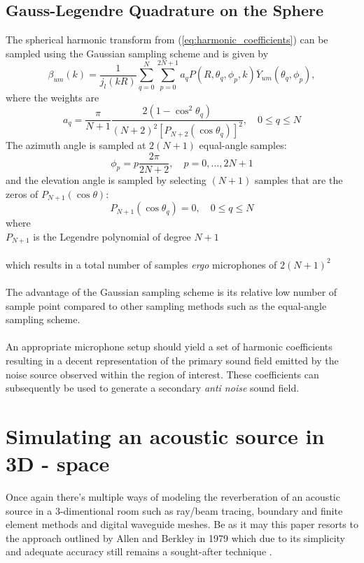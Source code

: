 \subsection{Gauss-Legendre Quadrature on the Sphere}\label{sec:Gauss}
The spherical harmonic transform from (\ref{eq:harmonic_coefficients}) can be sampled using the Gaussian sampling scheme and is given by
\begin{equation}
    \beta_{um}(k) = \frac{1}{j_l(kR)} \sum_{q=0}^N\sum_{p=0}^{2N+1}a_qP(R,\theta_q,\phi_p,k)\overline Y_{um}(\theta_q,\phi_p),
\end{equation}
where the weights are
\begin{equation}
    a_q = \frac{\pi}{N+1}\frac{2(1-\cos^2\theta_q)}{(N+2)^2[P_{N+2}(\cos \theta_q)]^2}, \quad 0 \leq q\leq N
\end{equation}
The azimuth angle is sampled at $2(N+1)$ equal-angle samples:
\begin{equation}
    \phi_p = p\frac{2\pi}{2N+2},\quad p=0,...,2N+1
    \label{eq:azimuth_sample}
\end{equation}
and the elevation angle is sampled by selecting $(N+1)$ samples that are the zeros of $P_{N+1}(\cos\theta)$:
\begin{equation}
    P_{N+1}(\cos\theta_q)=0, \quad 0 \leq q \leq N
    \label{eq:elevation_sample}
\end{equation}
where\\
$P_{N+1}$ is the Legendre polynomial of degree $N+1$\\\\
which results in a total number of samples \textit{ergo} microphones of $2(N+1)^2$\\\\
The advantage of the Gaussian sampling scheme is its relative low number of sample point compared to other sampling methods such as the equal-angle sampling scheme\cite{Rafaely2015}.\\\\
An appropriate microphone setup should yield a set of harmonic coefficients resulting in a decent representation of the primary sound field emitted by the noise source observed within the region of interest. These coefficients can subsequently be used to generate a secondary \textit{anti noise} sound field.





\section{Simulating an acoustic source in 3D - space}\label{sec:Simulation}
Once again there's multiple ways of modeling the reverberation of an acoustic source in a 3-dimentional room such as ray/beam tracing, boundary and finite element methods and digital waveguide meshes. Be as it may this paper resorts to the approach outlined by Allen and Berkley in 1979 which due to its simplicity and adequate accuracy still remains a sought-after technique \cite{Samarasinghe2018}.

